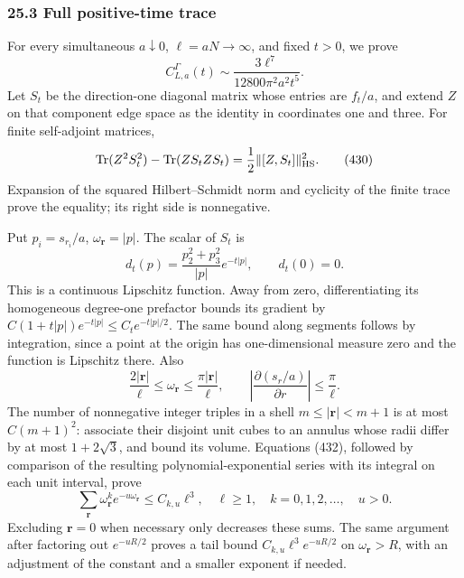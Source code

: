 \documentclass[
  11pt,
]{article}
\begin{document}
\subsubsection{25.3 Full positive-time
trace}\label{full-positive-time-trace}

For every simultaneous \(a\downarrow0\), \(\ell=aN\to\infty\), and fixed
\(t>0\), we prove \[
 C^\Gamma_{L,a}(t)
   \sim\frac{3\ell^7}{12800\pi^2a^2t^5}.
 \tag{429}
\] Let \(S_t\) be the direction-one diagonal matrix whose entries are
\(f_t/a\), and extend \(Z\) on that component edge space as the identity
in coordinates one and three. For finite self-adjoint matrices, \[
 \operatorname{Tr}(Z^2S_t^2)-\operatorname{Tr}(ZS_tZS_t)
              =\frac12\|[Z,S_t]\|_{\rm HS}^2.
 \tag{430}
\] Expansion of the squared Hilbert--Schmidt norm and cyclicity of the
finite trace prove the equality; its right side is nonnegative.

Put \(p_i=s_{r_i}/a\), \(\omega_{\boldsymbol r}=|p|\). The scalar of
\(S_t\) is \[
 d_t(p)=\frac{p_2^2+p_3^2}{|p|}e^{-t|p|},\qquad d_t(0)=0.
 \tag{431}
\] This is a continuous Lipschitz function. Away from zero,
differentiating its homogeneous degree-one prefactor bounds its gradient
by \(C(1+t|p|)e^{-t|p|}\le C_t e^{-t|p|/2}\). The same bound along
segments follows by integration, since a point at the origin has
one-dimensional measure zero and the function is Lipschitz there. Also
\[
 \frac{2|\boldsymbol r|}{\ell}\le\omega_{\boldsymbol r}
 \le\frac{\pi|\boldsymbol r|}{\ell},\qquad
 \left|\frac{\partial (s_r/a)}{\partial r}\right|\le\frac\pi\ell.
 \tag{432}
\] The number of nonnegative integer triples in a shell
\(m\le|\boldsymbol r|<m+1\) is at most \(C(m+1)^2\): associate their
disjoint unit cubes to an annulus whose radii differ by at most
\(1+2\sqrt3\), and bound its volume. Equations (432), followed by
comparison of the resulting polynomial-exponential series with its
integral on each unit interval, prove \[
 \sum_{\boldsymbol r}\omega_{\boldsymbol r}^k
                 e^{-u\omega_{\boldsymbol r}}\le C_{k,u}\ell^3,
 \quad \ell\ge1,\quad k=0,1,2,\ldots,\quad u>0 .
 \tag{433}
\] Excluding \(\boldsymbol r=0\) when necessary only decreases these
sums. The same argument after factoring out \(e^{-uR/2}\) proves a tail
bound \(C_{k,u}\ell^3e^{-uR/2}\) on \(\omega_{\boldsymbol r}>R\), with
an adjustment of the constant and a smaller exponent if needed.
\end{document}
